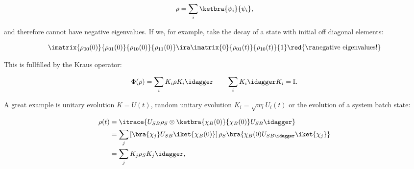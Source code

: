   \begin{equation}\label{key}
  	\rho = \sum_i\ketbra{\psi_i}{\psi_i},
  \end{equation}
  
  \noindent and therefore cannot have negative eigenvalues. If we, for example, take the decay of a state with initial off diagonal elements:
  
  \begin{equation}\label{key}
  	\imatrix{\rho_{00}(0)}{\rho_{01}(0)}{\rho_{10}(0)}{\rho_{11}(0)} \ira \imatrix{0}{\rho_{01}(t)}{\rho_{10}(t)}{1} \red{\ra \text{negative eigenvalues!}}
  \end{equation}
  

  \noindent This is fullfilled by the Kraus operator:
  
  \begin{equation}\label{key}
  	\Phi(\rho) = \sum_iK_i\rho K_i\idagger\qquad \sum_iK_i\idagger K_i = \mathbb{I}.
  \end{equation}
  
  \noindent A great example is unitary evolution $ K = U(t) $, random unitary evolution $ K_i = \sqrt{w_i}U_i(t) $ or the evolution of a system batch state:
  
  \begin{equation}\label{key}
  	\begin{aligned}
  	\rho(t) & = \itrace{U_{SB} \rho_S\otimes\ketbra{\chi_B(0)}{\chi_B(0)}U_{SB}\idagger}\\
  	& = \sum_j\left[\bra{\chi_j}U_{SB}\iket{\chi_B(0)}\right]\rho_{S}\bra{\chi_{B}(0)U_{SB\idagger}\iket{\chi_j}}\\
  	& = \sum_j K_j\rho_{S}K_j\idagger,
  	\end{aligned}
  \end{equation}
 
